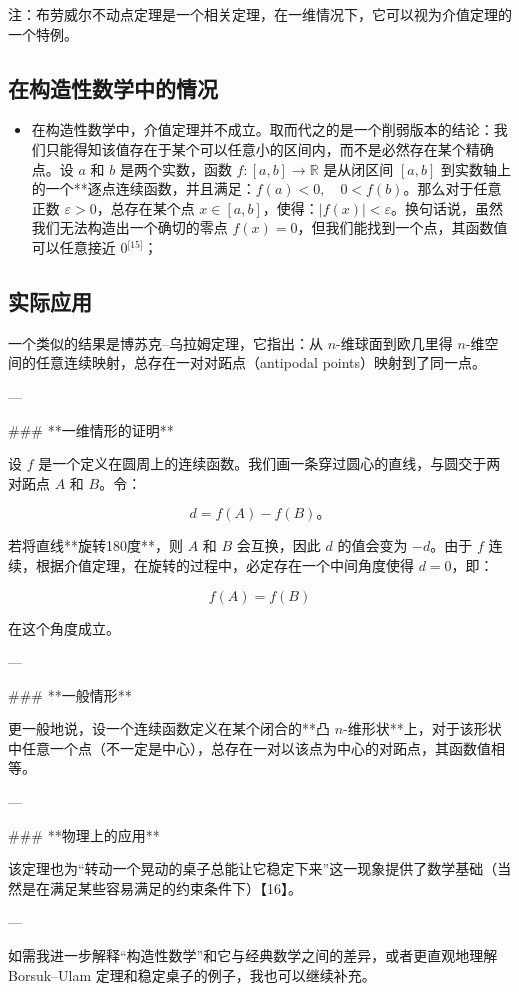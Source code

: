 注：布劳威尔不动点定理是一个相关定理，在一维情况下，它可以视为介值定理的一个特例。
\subsection{在构造性数学中的情况}
\begin{itemize}
\item 在构造性数学中，介值定理并不成立。取而代之的是一个削弱版本的结论：我们只能得知该值存在于某个可以任意小的区间内，而不是必然存在某个精确点。设 $a$ 和 $b$ 是两个实数，函数 $f: [a, b] \to \mathbb{R}$ 是从闭区间 $[a, b]$ 到实数轴上的一个**逐点连续函数，并且满足：$f(a) < 0,\quad 0 < f(b)$。那么对于任意正数 $\varepsilon > 0$，总存在某个点 $x \in [a, b]$，使得：$|f(x)| < \varepsilon$。换句话说，虽然我们无法构造出一个确切的零点 $f(x) = 0$，但我们能找到一个点，其函数值可以任意接近 0\(^\text{[15]}\)；
\end{itemize}
\subsection{实际应用}
一个类似的结果是博苏克–乌拉姆定理，它指出：从 $n$-维球面到欧几里得 $n$-维空间的任意连续映射，总存在一对\*\*对跖点（antipodal points）\*\*映射到了同一点。

---

### **一维情形的证明**

设 $f$ 是一个定义在圆周上的连续函数。我们画一条穿过圆心的直线，与圆交于两对跖点 $A$ 和 $B$。令：

$$
d = f(A) - f(B)。
$$

若将直线**旋转180度**，则 $A$ 和 $B$ 会互换，因此 $d$ 的值会变为 $-d$。由于 $f$ 连续，根据介值定理，在旋转的过程中，必定存在一个中间角度使得 $d = 0$，即：

$$
f(A) = f(B)
$$

在这个角度成立。

---

### **一般情形**

更一般地说，设一个连续函数定义在某个闭合的**凸 $n$-维形状**上，对于该形状中任意一个点（不一定是中心），总存在一对以该点为中心的对跖点，其函数值相等。

---

### **物理上的应用**

该定理也为\*\*“转动一个晃动的桌子总能让它稳定下来”\*\*这一现象提供了数学基础（当然是在满足某些容易满足的约束条件下）【16】。

---

如需我进一步解释“构造性数学”和它与经典数学之间的差异，或者更直观地理解 Borsuk–Ulam 定理和稳定桌子的例子，我也可以继续补充。
